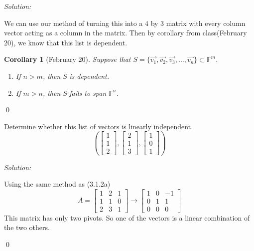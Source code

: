 \documentclass[11 pt]{article}
\newenvironment{problem}[2][Problem]{\begin{trivlist}
\item[\hskip \labelsep {\bfseries #1}\hskip \labelsep {\bfseries #2.}]}{\end{trivlist}}
\newenvironment{sol}
    {\emph{Solution:}
    }
    {
    \qed
    }
\newtheorem*{corollary}{Corollary}
\theoremstyle{definition}
\newcommand{\F}{\mathbb{F}} %
\begin{document}
\begin{sol}
We can use our method of turning this into a 4 by 3 matrix with every column vector acting as a column in the matrix. Then by corollary from class(February 20), we know that this list is dependent.
\begin{corollary}[February 20]
Suppose that $S=\{\vec{v_1},\vec{v_2},\vec{v_3},\dots,\vec{v_n}\} \subset \F^m$.\\
\begin{enumerate}
    \item If $n > m$, then S is dependent.
    \item If $m > n$, then S fails to span $\F^n$.
\end{enumerate}
\end{corollary}
\end{sol}


\begin{problem}{3.1.2c}
Determine whether this list of vectors is linearly independent. \\
\[\left (\begin{bmatrix}
1 \\ 1 \\ 2
\end{bmatrix},\begin{bmatrix}
2\\1\\3
\end{bmatrix},
\begin{bmatrix}
1\\0\\1
\end{bmatrix}
\right )\]
\end{problem}

\begin{sol}
Using the same method as (3.1.2a)
\[A=\begin{bmatrix}
1 & 2 & 1\\
1 & 1 & 0\\
2 & 3 & 1
\end{bmatrix}\xrightarrow{}\begin{bmatrix}
1 & 0 & -1\\
0 & 1 & 1\\
0 & 0 & 0
\end{bmatrix}\]
This matrix has only two pivots. So one of the vectors is a linear combination of the two others.
\end{sol}
\end{document}
